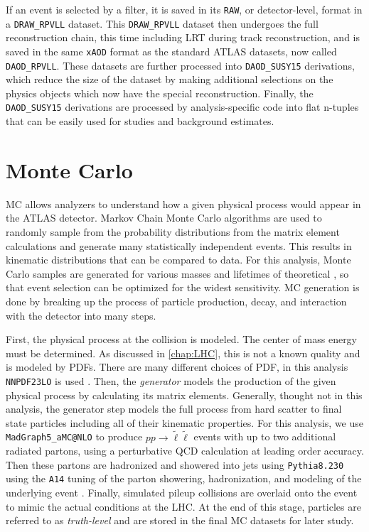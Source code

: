 If an event is selected by a filter, it is saved in its \texttt{RAW}, or detector-level, format in a \texttt{DRAW\_RPVLL} dataset. This \texttt{DRAW\_RPVLL} dataset then undergoes the full reconstruction chain, this time including \ac{LRT} during track reconstruction, and is saved in the same \texttt{xAOD} format as the standard \ac{ATLAS} datasets, now called \texttt{DAOD\_RPVLL}. These datasets are further processed into \texttt{DAOD\_SUSY15} derivations, which reduce the size of the dataset by making additional selections on the physics objects which now have the special reconstruction. Finally, the \texttt{DAOD\_SUSY15} derivations are processed by analysis-specific code into flat n-tuples that can be easily used for studies and background estimates. 

\section{\label{sec:mc}Monte Carlo}

\acf{MC} allows analyzers to understand how a given physical process would appear in the \ac{ATLAS} detector. Markov Chain Monte Carlo algorithms are used to randomly sample from the probability distributions from the matrix element calculations and generate many statistically independent events. This results in kinematic distributions that can be compared to data. For this analysis, Monte Carlo samples are generated for various masses and lifetimes of theoretical \slep, so that event selection can be optimized for the widest sensitivity. \ac{MC} generation is done by breaking up the process of particle production, decay, and interaction with the detector into many steps. 


First, the physical process at the collision is modeled. The center of mass energy must be determined. As discussed in \autoref{chap:LHC}, this is not a known quality and is modeled by \ac{PDF}s. There are many different choices of \ac{PDF}, in this analysis \texttt{NNPDF23LO} is used \cite{pdfs} . Then, the \emph{generator} models the production of the given physical process by calculating its matrix elements. Generally, thought not in this analysis, the generator step models the full process from hard scatter to final state particles including all of their kinematic properties. For this analysis, we use \texttt{MadGraph5\_aMC@NLO} \cite{madgraph} to produce $pp \rightarrow \tilde{\ell}\tilde{\ell}$ events with up to two additional radiated partons, using a perturbative \ac{QCD} calculation at leading order accuracy. Then these partons are hadronized and showered into jets using \texttt{Pythia8.230} using the \texttt{A14} tuning of the parton showering, hadronization, and modeling of the underlying event \cite{atlas-pythia}. Finally, simulated pileup collisions are overlaid onto the event to mimic the actual conditions at the \ac{LHC}. At the end of this stage, particles are referred to as \emph{truth-level} and are stored in the final \ac{MC} datasets for later study.

